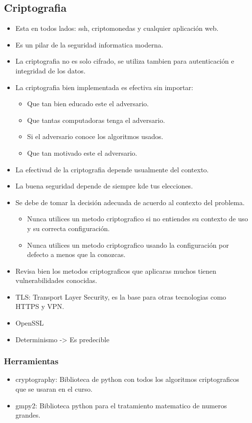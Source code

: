 \documentclass[11pt]{article}
\begin{document}
\subsection{Criptografia}
\label{sec:orgea71204}
\begin{itemize}
\item Esta en todos lados: ssh, criptomonedas y cualquier aplicación web.
\item Es un pilar de la seguridad informatica moderna.
\item La criptografia no es solo cifrado, se utiliza tambien para autenticación e integridad de los datos.
\item La criptografia bien implementada es efectiva sin importar:
\begin{itemize}
\item Que tan bien educado este el adversario.
\item Que tantas computadoras tenga el adversario.
\item Si el adversario conoce los algoritmos usados.
\item Que tan motivado este el adversario.
\end{itemize}
\item La efectivad de la criptografia depende usualmente del contexto.
\item La buena seguridad depende de siempre kde tus elecciones.
\item Se debe de tomar la decisión adecuada de acuerdo al contexto del problema.
\begin{itemize}
\item Nunca utilices un metodo criptografico si no entiendes su contexto de uso y su correcta configuración.
\item Nunca utilices un metodo criptografico usando la configuración por defecto a menos que la conozcas.
\end{itemize}
\item Revisa bien los metodos criptograficos que aplicaras muchos tienen vulnerabilidades conocidas.
\item TLS: Transport Layer Security, es la base para otras tecnologias como HTTPS y VPN.
\item OpenSSL
\item Determinismo -> Es predecible
\end{itemize}
\subsubsection{Herramientas}
\label{sec:orgad4682f}
\begin{itemize}
\item cryptography: Biblioteca de python con todos los algoritmos criptograficos que se usaran en el curso.
\item gmpy2: Biblioteca python para el tratamiento matematico de numeros grandes.
\end{itemize}
\end{document}

